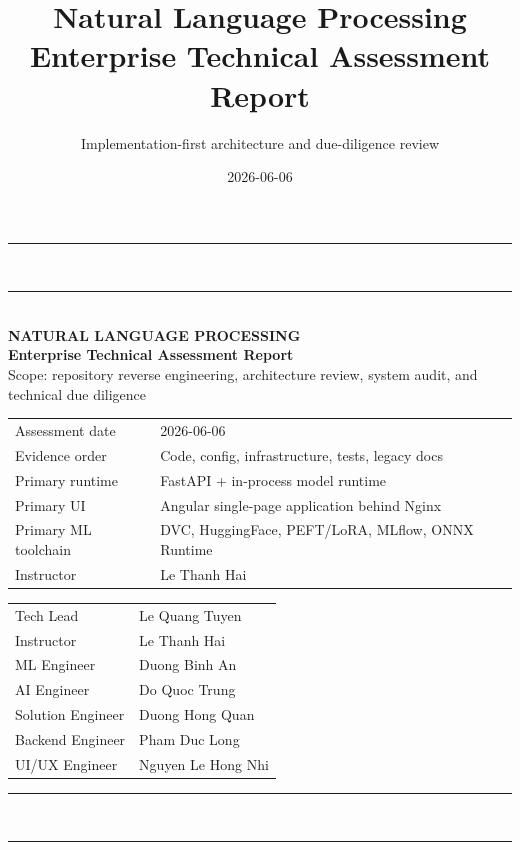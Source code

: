 

\title{\textbf{Natural Language Processing}\\Enterprise Technical Assessment Report}
\author{Implementation-first architecture and due-diligence review}
\date{2026-06-06}



\begin{titlepage}
\thispagestyle{empty}
\centering
{\color{NavyBlue}\rule{\linewidth}{3pt}}\\[0.4em]
{\color{SteelBlue}\rule{\linewidth}{1pt}}\\[1.0cm]
{\Large\bfseries\color{NavyBlue} NATURAL LANGUAGE PROCESSING}\\[0.25em]
{\large\bfseries Enterprise Technical Assessment Report}\\[0.35em]
{\normalsize Scope: repository reverse engineering, architecture review, system audit, and technical due diligence}\\[0.9cm]

\begin{tabular}{@{}ll@{}}
Assessment date & 2026-06-06 \\
Evidence order & Code, config, infrastructure, tests, legacy docs \\
Primary runtime & FastAPI + in-process model runtime \\
Primary UI & Angular single-page application behind Nginx \\
Primary ML toolchain & DVC, HuggingFace, PEFT/LoRA, MLflow, ONNX Runtime \\
Instructor & Le Thanh Hai \\

\end{tabular}

\vspace{0.6cm}
\begin{tabular}{@{}ll@{}}
Tech Lead & Le Quang Tuyen \\
Instructor & Le Thanh Hai \\
ML Engineer & Duong Binh An \\
AI Engineer & Do Quoc Trung \\
Solution Engineer & Duong Hong Quan \\
Backend Engineer & Pham Duc Long \\
UI/UX Engineer & Nguyen Le Hong Nhi \\
\end{tabular}

\vfill
{}
\vfill
{\color{SteelBlue}\rule{\linewidth}{1pt}}\\[0.25em]
{\color{NavyBlue}\rule{\linewidth}{3pt}}
\end{titlepage}

